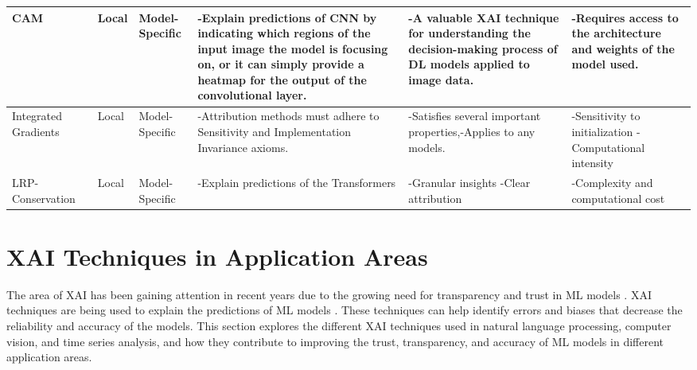 \documentclass[final,5p,times,twocolumn]{elsarticle}
\begin{document}
\begin{table}[!h]
\begin{center}
\begin{tabular}{m{40pt}|m{25pt}|m{45pt}|m{110pt}|m{70pt}|m{150pt}}
        CAM~\cite{zhou2016learning} &Local &Model-Specific&-Explain predictions of CNN by indicating which regions of the input image the model is focusing on, or it can simply provide a heatmap for the output of the convolutional layer.& -A valuable XAI technique for understanding the decision-making process of DL models applied to image data.&-Requires access to the architecture and weights of the model used. \\  \hline  
        Integrated Gradients ~\cite{sundararajan2017axiomatic} &Local & Model-Specific&-Attribution methods must adhere to Sensitivity and Implementation Invariance axioms. &-Satisfies several important properties,\newline-Applies to any models. &-Sensitivity to initialization \newline -Computational intensity \\  \hline   
       
        LRP- Conservation~\cite{ali2022xai} & Local & Model-Specific & -Explain predictions of the Transformers & -Granular insights \newline -Clear attribution & -Complexity and computational cost\\  \hline
        
        \end{tabular}
    \end{center}  
\end{table}






\section{XAI Techniques in Application Areas} \label{sectionApplication}

The area of XAI has been gaining attention in recent years due to the growing need for transparency and trust in ML models \cite{ribeiro2016should, lundberg2017unified}. XAI techniques are being used to explain the predictions of ML models \cite{doshi2017towards,samek2017explainable, gilpin2018explaining}. These techniques can help identify errors and biases that decrease the reliability and accuracy of the models. This section explores the different XAI techniques used in natural language processing, computer vision, and time series analysis, and how they contribute to improving the trust, transparency, and accuracy of ML models in different application areas.
\end{document}
